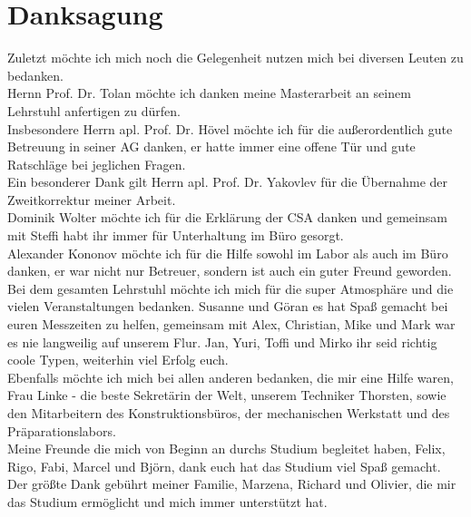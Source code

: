 \chapter{Danksagung}
Zuletzt möchte ich mich noch die Gelegenheit nutzen mich bei diversen Leuten zu bedanken.\\

Hernn Prof. Dr. Tolan möchte ich danken meine Masterarbeit an seinem Lehrstuhl anfertigen zu dürfen.\\
Insbesondere Herrn apl. Prof. Dr. Hövel möchte ich für die außerordentlich gute Betreuung in seiner AG danken, er hatte immer eine offene Tür und gute Ratschläge bei jeglichen Fragen.\\
Ein besonderer Dank gilt Herrn apl. Prof. Dr. Yakovlev für die Übernahme der Zweitkorrektur meiner Arbeit.\\

Dominik Wolter möchte ich für die Erklärung der CSA danken und gemeinsam mit Steffi habt ihr immer für Unterhaltung im Büro gesorgt.\\
Alexander Kononov möchte ich für die Hilfe sowohl im Labor als auch im Büro danken, er war nicht nur Betreuer, sondern ist auch ein guter Freund geworden.\\
Bei dem gesamten Lehrstuhl möchte ich mich für die super Atmosphäre und die vielen Veranstaltungen bedanken.
Susanne und Göran es hat Spaß gemacht bei euren Messzeiten zu helfen, gemeinsam mit Alex, Christian, Mike und Mark war es nie langweilig auf unserem Flur.
Jan, Yuri, Toffi und Mirko ihr seid richtig coole Typen, weiterhin viel Erfolg euch.\\
Ebenfalls möchte ich mich bei allen anderen bedanken, die mir eine Hilfe waren, Frau Linke - die beste Sekretärin der Welt, unserem Techniker Thorsten, sowie den Mitarbeitern des Konstruktionsbüros, der mechanischen Werkstatt und des Präparationslabors.\\
Meine Freunde die mich von Beginn an durchs Studium begleitet haben, Felix, Rigo, Fabi, Marcel und Björn, dank euch hat das Studium viel Spaß gemacht.\\

Der größte Dank gebührt meiner Familie, Marzena, Richard und Olivier, die mir das Studium ermöglicht und mich immer unterstützt hat.
